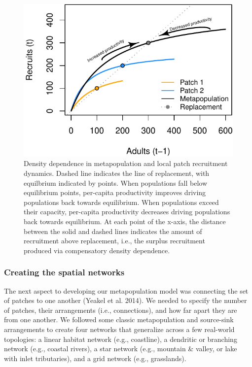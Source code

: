 \documentclass[
]{article}
\begin{document}
\begin{figure}[H]

{\centering \includegraphics{Managing_for_ecological_surprises_in_metapopulations_files/figure-latex/recruit curves-1} 

}

\caption{Density dependence in metapopulation and local patch recruitment dynamics. Dashed line indicates the line of replacement, with equilbrium indicated by points. When populations fall below equilibrium points, per-capita productivity improves driving populations back towards equilibrium. When populations exceed their capacity, per-capita productivity decreases driving populations back towards equilibrium. At each point of the x-axis, the distance between the solid and dashed lines indicates the amount of recruitment above replacement, i.e., the surplus recruitment produced via compensatory density dependence.}\label{fig:recruit curves}
\end{figure}

\hypertarget{creating-the-spatial-networks}{%
\subsubsection{Creating the spatial
networks}\label{creating-the-spatial-networks}}

The next aspect to developing our metapopulation model was connecting
the set of patches to one another (Yeakel et al. 2014). We needed to
specify the number of patches, their arrangements (i.e., connections),
and how far apart they are from one another. We followed some classic
metapopulation and source-sink arrangements to create four networks that
generalize across a few real-world topologies: a linear habitat network
(e.g., coastline), a dendritic or branching network (e.g., coastal
rivers), a star network (e.g., mountain \& valley, or lake with inlet
tributaries), and a grid network (e.g., grasslands).
\end{document}
